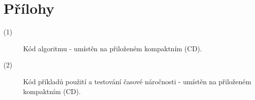 \chapter*{Přílohy}

\begin{description}
  \item[(1)] Kód algoritmu - umístěn na přiloženém kompaktním (CD). 
  \item[(2)] Kód příkladů použití a testování časové náročnosti - umístěn na přiloženém kompaktním (CD). 
\end{description}